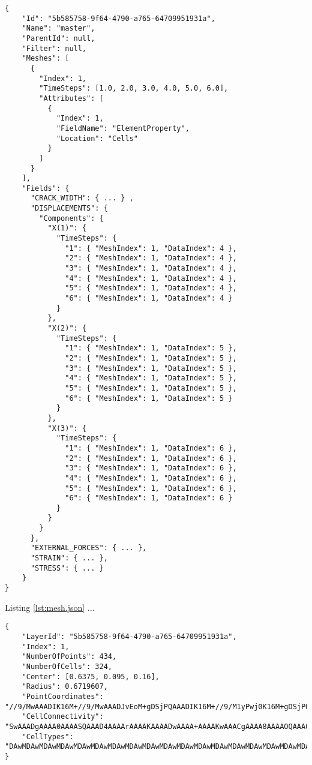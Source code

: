 \begin{lstlisting}[style=json,caption=Example of summary.json document,label=lst:summary.json]
{
    "Id": "5b585758-9f64-4790-a765-64709951931a",
    "Name": "master",
    "ParentId": null,
    "Filter": null,
    "Meshes": [
      {
        "Index": 1,
        "TimeSteps": [1.0, 2.0, 3.0, 4.0, 5.0, 6.0],
        "Attributes": [
          {
            "Index": 1,
            "FieldName": "ElementProperty",
            "Location": "Cells"
          }
        ]
      }
    ],
    "Fields": {
      "CRACK_WIDTH": { ... } ,
      "DISPLACEMENTS": {
        "Components": {
          "X(1)": {
            "TimeSteps": {
              "1": { "MeshIndex": 1, "DataIndex": 4 },
              "2": { "MeshIndex": 1, "DataIndex": 4 },
              "3": { "MeshIndex": 1, "DataIndex": 4 },
              "4": { "MeshIndex": 1, "DataIndex": 4 },
              "5": { "MeshIndex": 1, "DataIndex": 4 },
              "6": { "MeshIndex": 1, "DataIndex": 4 }
            }
          },
          "X(2)": {
            "TimeSteps": {
              "1": { "MeshIndex": 1, "DataIndex": 5 },
              "2": { "MeshIndex": 1, "DataIndex": 5 },
              "3": { "MeshIndex": 1, "DataIndex": 5 },
              "4": { "MeshIndex": 1, "DataIndex": 5 },
              "5": { "MeshIndex": 1, "DataIndex": 5 },
              "6": { "MeshIndex": 1, "DataIndex": 5 }
            }
          },
          "X(3)": {
            "TimeSteps": {
              "1": { "MeshIndex": 1, "DataIndex": 6 },
              "2": { "MeshIndex": 1, "DataIndex": 6 },
              "3": { "MeshIndex": 1, "DataIndex": 6 },
              "4": { "MeshIndex": 1, "DataIndex": 6 },
              "5": { "MeshIndex": 1, "DataIndex": 6 },
              "6": { "MeshIndex": 1, "DataIndex": 6 }
            }
          }
        }
      },
      "EXTERNAL_FORCES": { ... },
      "STRAIN": { ... },
      "STRESS": { ... }
    }
}
\end{lstlisting}

Listing \ref{lst:mesh.json} ...

\begin{lstlisting}[style=json,caption=Example of mesh.json document,label=lst:mesh.json]
{
    "LayerId": "5b585758-9f64-4790-a765-64709951931a",
    "Index": 1,
    "NumberOfPoints": 434,
    "NumberOfCells": 324,
    "Center": [0.6375, 0.095, 0.16],
    "Radius": 0.6719607,
    "PointCoordinates": "//9/MwAAADIK16M+//9/MwAAADJvEoM+gDSjPQAAADIK16M+//9/M1yPwj0K16M+gDSjPQAAAD...",
    "CellConnectivity": "SwAAADgAAAA0AAAASQAAAD4AAAArAAAAKAAAADwAAAA+AAAAKwAAACgAAAA8AAAAOQAAACUAAA...",
    "CellTypes": "DAwMDAwMDAwMDAwMDAwMDAwMDAwMDAwMDAwMDAwMDAwMDAwMDAwMDAwMDAwMDAwMDAwMDAwMDAwMDAwMD..."
}
\end{lstlisting}

